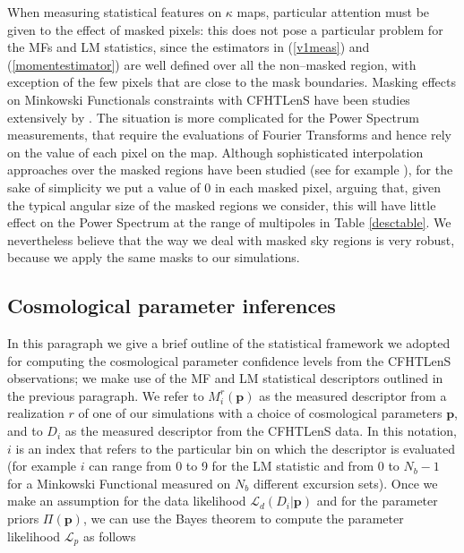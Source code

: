\documentclass[reprint,aps,prd,superscriptaddress,showkeys,showpacs]{revtex4-1}
\begin{document}
When measuring statistical features on $\kappa$ maps, particular attention must be given to the effect of masked pixels: this does not pose a particular problem for the MFs and LM statistics, since the estimators in (\ref{v1meas}) and (\ref{momentestimator}) are well defined over all the non--masked region, with exception of the few pixels that are close to the mask boundaries. Masking effects on Minkowski Functionals constraints with CFHTLenS have been studies extensively by \citep{CFHTMasato}. The situation is more complicated for the Power Spectrum measurements, that require the evaluations of Fourier Transforms and hence rely on the value of each pixel on the map. Although sophisticated interpolation approaches over the masked regions have been studied (see for example \citep{VplasInterpolation}), for the sake of simplicity we put a value of 0 in each masked pixel, arguing that, given the typical angular size of the masked regions we consider, this will have little effect on the Power Spectrum at the range of multipoles in Table \ref{desctable}. We nevertheless believe that the way we deal with masked sky regions is very robust, because we apply the same masks to our simulations. 


\subsection{Cosmological parameter inferences}
\label{cosmostats}
In this paragraph we give a brief outline of the statistical framework we adopted for computing the cosmological parameter confidence levels from the CFHTLenS observations; we make use of the MF and LM statistical descriptors outlined in the previous paragraph. We refer to $M_i^r(\mathbf{p})$ as the measured descriptor from a realization $r$ of one of our simulations with a choice of cosmological parameters $\mathbf{p}$, and to $D_i$ as the measured descriptor from the CFHTLenS data. In this notation, $i$ is an index that refers to the particular bin on which the descriptor is evaluated (for example $i$ can range from 0 to 9 for the LM statistic and from 0 to $N_b-1$ for a Minkowski Functional measured on $N_b$ different excursion sets). Once we make an assumption for the data likelihood $\mathcal{L}_d(D_i\vert \mathbf{p})$ and for the parameter priors $\Pi(\mathbf{p})$, we can use the Bayes theorem to compute the parameter likelihood $\mathcal{L}_p$ as follows
\end{document}
